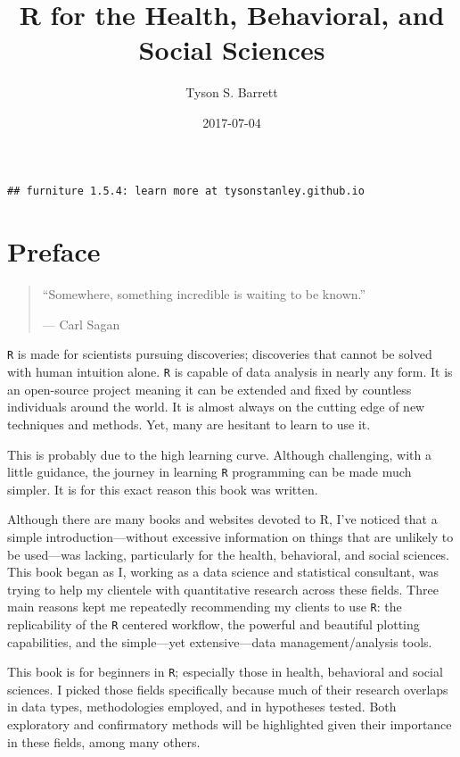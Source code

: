 \documentclass[]{tufte-book}
\title{R for the Health, Behavioral, and Social Sciences}
\author{Tyson S. Barrett}
\date{2017-07-04}
\theoremstyle{definition}
\theoremstyle{definition}
\theoremstyle{remark}
\begin{document}
\maketitle



{
\setcounter{tocdepth}{1}
\tableofcontents
}

\begin{verbatim}
## furniture 1.5.4: learn more at tysonstanley.github.io
\end{verbatim}

\chapter*{Preface}\label{preface}

\begin{quote}
``Somewhere, something incredible is waiting to be known.''

--- Carl Sagan
\end{quote}

\texttt{R} is made for scientists pursuing discoveries; discoveries that
cannot be solved with human intuition alone. \texttt{R} is capable of
data analysis in nearly any form. It is an open-source project meaning
it can be extended and fixed by countless individuals around the world.
It is almost always on the cutting edge of new techniques and methods.
Yet, many are hesitant to learn to use it.

This is probably due to the high learning curve. Although challenging,
with a little guidance, the journey in learning \texttt{R} programming
can be made much simpler. It is for this exact reason this book was
written.

Although there are many books and websites devoted to R, I've noticed
that a simple introduction---without excessive information on things
that are unlikely to be used---was lacking, particularly for the health,
behavioral, and social sciences. This book began as I, working as a data
science and statistical consultant, was trying to help my clientele with
quantitative research across these fields. Three main reasons kept me
repeatedly recommending my clients to use \texttt{R}: the replicability
of the \texttt{R} centered workflow, the powerful and beautiful plotting
capabilities, and the simple---yet extensive---data management/analysis
tools.

This book is for beginners in \texttt{R}; especially those in health,
behavioral and social sciences. I picked those fields specifically
because much of their research overlaps in data types, methodologies
employed, and in hypotheses tested. Both exploratory and confirmatory
methods will be highlighted given their importance in these fields,
among many others.
\end{document}
